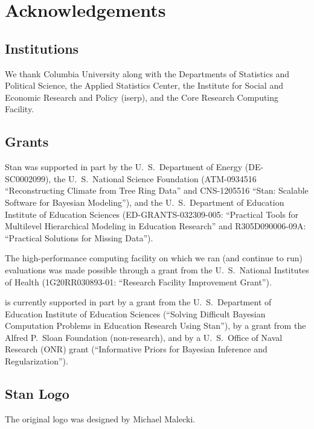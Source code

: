 \chapter*{Acknowledgements}

\section*{Institutions}

We thank Columbia University along with the Departments of
Statistics and Political Science, the Applied Statistics Center, the
Institute for Social and Economic Research and Policy ({\sc iserp}),
and the Core Research Computing Facility.

\section*{Grants}

Stan was supported in part by 
%
the U.~S.\ Department of Energy 
({\small DE-SC0002099}), 
%
the U.~S.\ National Science Foundation 
({\small ATM-0934516}
``Reconstructing Climate from Tree Ring Data''
and {\small CNS-1205516} ``Stan: Scalable Software for Bayesian Modeling''),
%
and 
the U.~S.\ Department of Education Institute of Education Sciences 
({\small ED-GRANTS-032309-005}:
 ``Practical Tools for Multilevel Hierarchical Modeling in Education
 Research'' and
 {\small R305D090006-09A}:
 ``Practical Solutions for Missing Data'').

The high-performance computing facility on which we ran (and continue
to run) evaluations was made possible through a grant from the U.~S.\
National Institutes of Health ({\small 1G20RR030893-01}: ``Research
Facility Improvement Grant'').

\Stan is currently supported in part by a grant from the U.~S.\
Department of Education Institute of Education Sciences (``Solving
Difficult Bayesian Computation Problems in Education Research Using
Stan''), by a grant from the Alfred P.\ Sloan Foundation
(non-research), and by a U.~S.\ Office of Naval Research (ONR) grant
(``Informative Priors for Bayesian Inference and Regularization'').
%


\section*{Stan Logo}

The original logo was designed by Michael Malecki.

